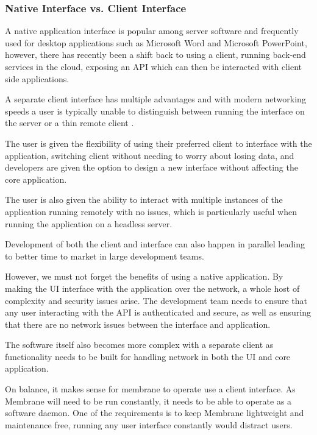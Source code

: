 \documentclass[11pt, a4paper, twocolumn, twoside]{report}
\begin{document}
\subsubsection{Native Interface vs. Client Interface}

A native application interface is popular among server software and frequently used for desktop applications such as Microsoft Word and Microsoft PowerPoint, however, there has recently been a shift back to using a client, running back-end services in the cloud, exposing an API which can then be interacted with client side applications.

A separate client interface has multiple advantages and with modern networking speeds a user is typically unable to distinguish between running the interface on the server or a thin remote client \citep{schmidt1999interactive}.

The user is given the flexibility of using their preferred client to interface with the application, switching client without needing to worry about losing data, and developers are given the option to design a new interface without affecting the core application.

The user is also given the ability to interact with multiple instances of the application running remotely with no issues, which is particularly useful when running the application on a headless server.

Development of both the client and interface can also happen in parallel leading to better time to market in large development teams.

However, we must not forget the benefits of using a native application. By making the UI interface with the application over the network, a whole host of complexity and security issues arise. The development team needs to ensure that any user interacting with the API is authenticated and secure, as well as ensuring that there are no network issues between the interface and application.

The software itself also becomes more complex with a separate client as functionality needs to be built for handling network in both the UI and core application.

On balance, it makes sense for membrane to operate use a client interface. As Membrane will need to be run constantly, it needs to be able to operate as a software daemon. One of the requirements is to keep Membrane lightweight and maintenance free, running any user interface constantly would distract users.
\end{document}
